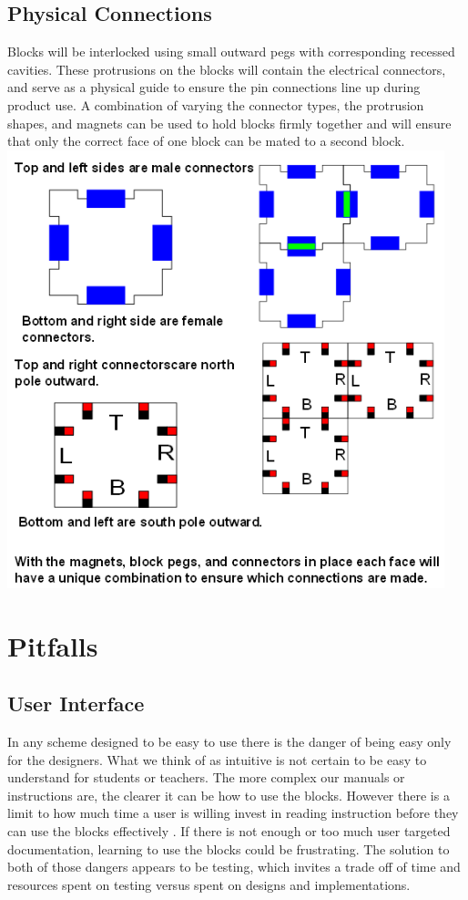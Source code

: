 \subsection{Physical Connections}
Blocks will be interlocked using small outward pegs with corresponding recessed cavities. These protrusions on the blocks will contain the electrical connectors, and serve as a physical guide to ensure the pin connections line up during product use. A combination of varying the connector types, the protrusion shapes, and magnets can be used to hold blocks firmly together and  will ensure that only the correct face of one block can be mated to a second block.\\
\includegraphics[width=5in]{Connector_scheme_Drawing}


  \section{Pitfalls}
  \subsection{User Interface}
  In any scheme designed to be easy to use there is the danger of being easy only for the designers. What we think of as intuitive is not certain to be easy to understand for students or teachers. 
  The more complex our manuals or instructions are, the clearer it can be how to use the blocks. However there is a limit to how much time a  user is willing invest in reading instruction before they can use the blocks effectively . If there is not enough or too much user targeted documentation, learning to use the blocks could be frustrating.
  The solution to both of those dangers appears to be testing, which invites a trade off of time and resources spent on testing versus spent on designs and implementations. 
